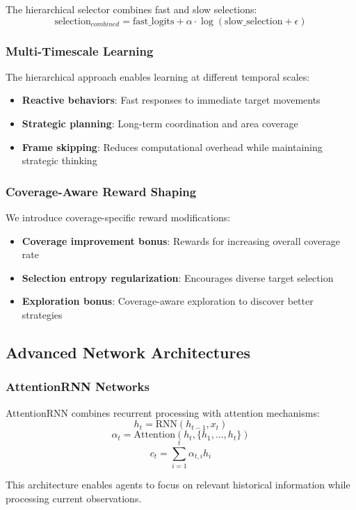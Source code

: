 \documentclass[conference]{IEEEtran}
\begin{document}
The hierarchical selector combines fast and slow selections:
$$\text{selection}_{combined} = \text{fast\_logits} + \alpha \cdot \log(\text{slow\_selection} + \epsilon)$$

\subsubsection{Multi-Timescale Learning}
The hierarchical approach enables learning at different temporal scales:
\begin{itemize}
\item \textbf{Reactive behaviors}: Fast responses to immediate target movements
\item \textbf{Strategic planning}: Long-term coordination and area coverage
\item \textbf{Frame skipping}: Reduces computational overhead while maintaining strategic thinking
\end{itemize}

\subsubsection{Coverage-Aware Reward Shaping}
We introduce coverage-specific reward modifications:
\begin{itemize}
\item \textbf{Coverage improvement bonus}: Rewards for increasing overall coverage rate
\item \textbf{Selection entropy regularization}: Encourages diverse target selection
\item \textbf{Exploration bonus}: Coverage-aware exploration to discover better strategies
\end{itemize}

\subsection{Advanced Network Architectures}

\subsubsection{AttentionRNN Networks}
AttentionRNN combines recurrent processing with attention mechanisms:
$$h_t = \text{RNN}(h_{t-1}, x_t)$$
$$\alpha_t = \text{Attention}(h_t, \{h_1, ..., h_t\})$$
$$c_t = \sum_{i=1}^t \alpha_{t,i} h_i$$

This architecture enables agents to focus on relevant historical information while processing current observations.
\end{document}
